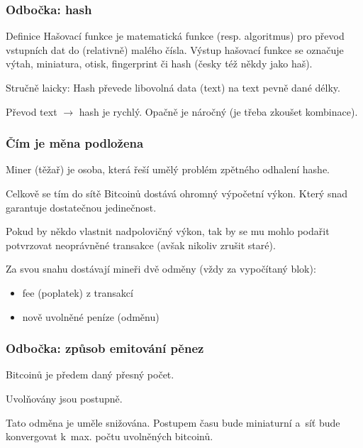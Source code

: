 \documentclass[xetex]{beamer}
\begin{document}
\begin{frame}
	\frametitle{Odbočka: hash}
	
	\begin{block}{Definice}
	Hašovací funkce je matematická funkce (resp. algoritmus) pro převod vstupních dat do (relativně) malého čísla. Výstup hašovací funkce se označuje výtah, miniatura, otisk, fingerprint či hash (česky též někdy jako haš).
	\end{block}

	\bigskip

	Stručně laicky: Hash převede libovolná data (text) na text pevně dané délky. 

	\bigskip

	Převod text $\rightarrow$ hash je rychlý. Opačně je náročný (je třeba zkoušet kombinace).

\end{frame}

\begin{frame}
	\frametitle{Čím je měna podložena}
	Miner (těžař) je osoba, která řeší umělý problém zpětného odhalení hashe.

	\bigskip

	Celkově se tím do sítě Bitcoinů dostává ohromný výpočetní výkon. Který snad garantuje dostatečnou jedinečnost.

	\bigskip

	Pokud by někdo vlastnit nadpolovičný výkon, tak by se mu mohlo podařit potvrzovat neoprávněné transakce (avšak nikoliv zrušit staré).

	\bigskip

	Za svou snahu dostávají mineři dvě odměny (vždy za vypočítaný blok):
	\begin{itemize}
		\item fee (poplatek) z transakcí
		\item nově uvolněné peníze (odměnu)
	\end{itemize}
\end{frame}

\begin{frame}
	\frametitle{Odbočka: způsob emitování pěnez}
	Bitcoinů je předem daný přesný počet.

	\bigskip
	
	Uvolňovány jsou postupně.

	\bigskip

	Tato odměna je uměle snižována. Postupem času bude miniaturní a~síť bude konvergovat k~max. počtu uvolněných bitcoinů.
\end{frame}
\end{document}
